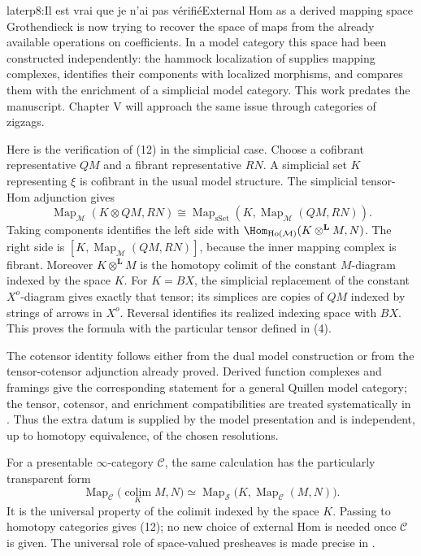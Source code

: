 \begin{dcomment}{later}{p8:Il est vrai que je n’ai pas vérifié}{External Hom as a derived mapping space}
Grothendieck is now trying to recover the space of maps from the already available operations on coefficients. In a model category this space had been constructed independently: the hammock localization of \citet[Corollary 4.2, Proposition 4.4, and Corollary 4.7]{DwyerKan1980Function} supplies mapping complexes, identifies their components with localized morphisms, and compares them with the enrichment of a simplicial model category. This work predates the manuscript. Chapter V will approach the same issue through categories of zigzags.

Here is the verification of (12) in the simplicial case. Choose a cofibrant representative \(QM\) and a fibrant representative \(RN\). A simplicial set \(K\) representing \(\xi\) is cofibrant in the usual model structure. The simplicial tensor-Hom adjunction gives
\[
 \operatorname{Map}_{\mathcal M}(K\otimes QM,RN)
 \cong
 \operatorname{Map}_{\mathrm{sSet}}
       (K,\operatorname{Map}_{\mathcal M}(QM,RN)).
\]
Taking components identifies the left side with
\(\Hom_{\mathrm{Ho}(\mathcal M)}(K\otimes^{\mathbf L}M,N)\).
The right side is
\([K,\operatorname{Map}_{\mathcal M}(QM,RN)]\), because the inner mapping complex is fibrant. Moreover \(K\otimes^{\mathbf L}M\) is the homotopy colimit of the constant \(M\)-diagram indexed by the space \(K\). For \(K=B X\), the simplicial replacement of the constant \(X^o\)-diagram gives exactly that tensor; its simplices are copies of \(QM\) indexed by strings of arrows in \(X^o\). Reversal identifies its realized indexing space with \(B X\). This proves the formula with the particular tensor defined in (4).

The cotensor identity follows either from the dual model construction or from the tensor-cotensor adjunction already proved. Derived function complexes and framings give the corresponding statement for a general Quillen model category; the tensor, cotensor, and enrichment compatibilities are treated systematically in \citet[Sections 10.2--10.3]{Riehl2014}. Thus the extra datum is supplied by the model presentation and is independent, up to homotopy equivalence, of the chosen resolutions.

For a presentable \(\infty\)-category \(\mathcal C\), the same calculation has the particularly transparent form
\[
 \operatorname{Map}_{\mathcal C}
 \bigl(\operatorname*{colim}_{K}M,N\bigr)
 \simeq
 \operatorname{Map}_{\mathcal S}
 \bigl(K,\operatorname{Map}_{\mathcal C}(M,N)\bigr).
\]
It is the universal property of the colimit indexed by the space \(K\). Passing to homotopy categories gives (12); no new choice of external Hom is needed once \(\mathcal C\) is given. The universal role of space-valued presheaves is made precise in \citet[Theorem 5.1.5.6]{Lurie2009HTT}.


\end{dcomment}
